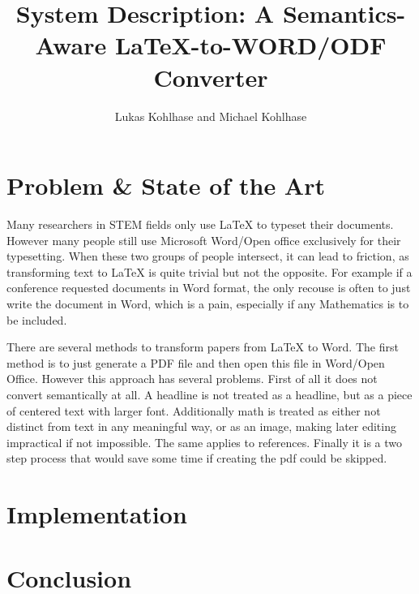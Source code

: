 \documentclass[draft]{llncs}
\title{System Description: A Semantics-Aware {\LaTeX}-to-WORD/ODF Converter}
\author{Lukas Kohlhase and Michael Kohlhase}
\institute{
  Math/CS, Jacobs University Bremen}
\begin{document}
\maketitle
\begin{abstract}
\end{abstract}

\section{Problem \& State of the Art}\label{sec:intro}

Many researchers in STEM fields only use {\LaTeX} to typeset their documents. However many
people still use Microsoft Word/Open office exclusively for their typesetting. When these
two groups of people intersect, it can lead to friction, as transforming text to {\LaTeX}
is quite trivial but not the opposite. For example if a conference requested documents in
Word format, the only recouse is often to just write the document in Word, which is a
pain, especially if any Mathematics is to be included.


There are several methods to transform papers from {\LaTeX} to Word. The first method is
to just generate a PDF file and then open this file in Word/Open Office. However this
approach has several problems. First of all it does not convert semantically at all. A
headline is not treated as a headline, but as a piece of centered text with larger
font. Additionally math is treated as either not distinct from text in any meaningful way,
or as an image, making later editing impractical if not impossible. The same applies to
references. Finally it is a two step process that would save some time if creating the pdf
could be skipped.   

\section{Implementation}\label{sec:impl}

\section{Conclusion}\label{sec:concl}
\printbibliography
\end{document}
